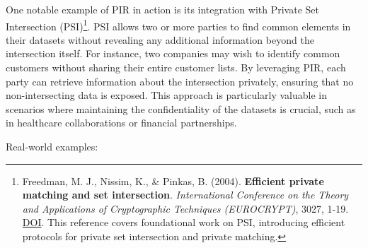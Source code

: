 \documentclass[
  letterpaper,
  DIV=11,
  numbers=noendperiod,
  oneside]{scrartcl}
\begin{document}
One notable example of PIR in action is its integration with Private Set
Intersection (PSI)\footnote{Freedman, M. J., Nissim, K., \& Pinkas, B.
  (2004). \textbf{Efficient private matching and set intersection}.
  \emph{International Conference on the Theory and Applications of
  Cryptographic Techniques (EUROCRYPT)}, 3027, 1-19.
  \href{https://doi.org/10.1007/978-3-540-24676-3_1}{DOI}. This
  reference covers foundational work on PSI, introducing efficient
  protocols for private set intersection and private matching.}. PSI
allows two or more parties to find common elements in their datasets
without revealing any additional information beyond the intersection
itself. For instance, two companies may wish to identify common
customers without sharing their entire customer lists. By leveraging
PIR, each party can retrieve information about the intersection
privately, ensuring that no non-intersecting data is exposed. This
approach is particularly valuable in scenarios where maintaining the
confidentiality of the datasets is crucial, such as in healthcare
collaborations or financial partnerships.

Real-world examples:
\end{document}
